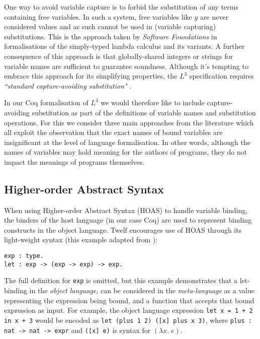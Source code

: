 \documentclass[]{unswthesis}
\begin{document}
One way to avoid variable capture is to forbid the substitution of any terms containing free variables. In such a system, free variables like $y$ are never considered values and as such cannot be used in (variable capturing) substitutions. This is the approach taken by \textit{Software Foundations} \cite{pierce15} in formalisations of the simply-typed lambda calculus and its variants. A further consequence of this approach is that globally-shared integers or strings for variable names are sufficient to guarantee soundness. Although it's tempting to embrace this approach for its simplifying properties, the $L^3$ specification requires \textit{``standard capture-avoiding substitution"} \cite{ahmed05}.


In our Coq formalisation of $L^3$ we would therefore like to include capture-avoiding substitution as part of the definitions of variable names and substitution operations. For this we consider three main approaches from the literature which all exploit the observation that the exact names of bound variables are insignificant at the level of language formalisation. In other words, although the names of variables may hold meaning for the authors of programs, they do not impact the meanings of programs themselves.

\subsection{Higher-order Abstract Syntax}

When using Higher-order Abstract Syntax (HOAS) to handle variable binding, the binders of the host language (in our case Coq) are used to represent binding constructs in the object language. Twelf encourages use of HOAS through its light-weight syntax (this example adapted from \cite{twelf08}):

\begin{verbatim}
exp : type.
let : exp -> (exp -> exp) -> exp.
\end{verbatim}

The full definition for \texttt{exp} is omitted, but this example demonstrates that a let-binding in the \textit{object language}, can be considered in the \textit{meta-language} as a value representing the expression being bound, and a function that accepts that bound expression as input. For example, the object language expression \texttt{let x = 1 + 2 in x + 3} would be encoded as \texttt{let (plus 1 2) ([x] plus x 3)}, where \texttt{plus : nat -> nat -> expr} and \texttt{([x] e)} is syntax for $(\lambda x. \; e)$.
\end{document}

